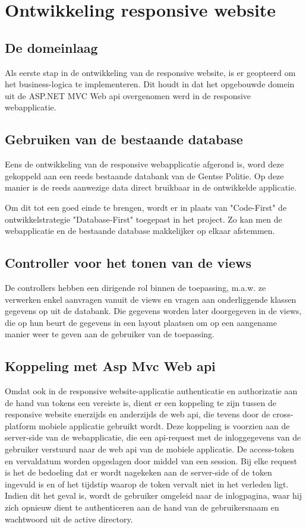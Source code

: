 \chapter{Ontwikkeling responsive website}
\label{ch:ontwikkelingresponsivewebsite}
\section{De domeinlaag}
Als eerste stap in de ontwikkeling van de responsive website, is er geopteerd om het business-logica te implementeren.
Dit houdt in dat het opgebouwde domein uit de ASP.NET MVC Web api overgenomen werd in de responsive webapplicatie.

\section{Gebruiken van de bestaande database}
Eens de ontwikkeling van de responsive webapplicatie afgerond is, word deze gekoppeld aan een reeds bestaande databank van de Gentse Politie.
Op deze manier is de reeds aanwezige data direct bruikbaar in de ontwikkelde applicatie.

Om dit tot een goed einde te brengen, wordt er in plaats van "Code-First" de ontwikkelstrategie "Database-First" toegepast in het project.
Zo kan men de webapplicatie en de bestaande database makkelijker op elkaar afstemmen.

\section{Controller voor het tonen van de views}
De controllers hebben een dirigende rol binnen de toepassing, m.a.w. ze verwerken enkel aanvragen vanuit de views en vragen aan onderliggende
klassen gegevens op uit de databank. Die gegevens worden later doorgegeven in de views, die op hun beurt de gegevens in een layout plaatsen om
op een aangename manier weer te geven aan de gebruiker van de toepassing.

\section{Koppeling met Asp Mvc Web api}
Omdat ook in de responsive website-applicatie authenticatie en authorizatie aan de hand van tokens een vereiste is,
dient er een koppeling te zijn tussen de responsive website enerzijds en anderzijds de web api, die tevens door de cross-platform
mobiele applicatie gebruikt wordt. Deze koppeling is voorzien aan de server-side van de webapplicatie, die een api-request met
de inloggegevens van de gebruiker verstuurd naar de web api van de mobiele applicatie. De access-token en vervaldatum worden
opgeslagen door middel van een session. Bij elke request is het de bedoeling dat er wordt nagekeken aan de server-side of
de token ingevuld is en of het tijdstip waarop de token vervalt niet in het verleden ligt. Indien dit het geval is, wordt
de gebruiker omgeleid naar de inlogpagina, waar hij zich opnieuw dient te authenticeren aan de hand van de gebruikersnaam en
wachtwoord uit de active directory.
